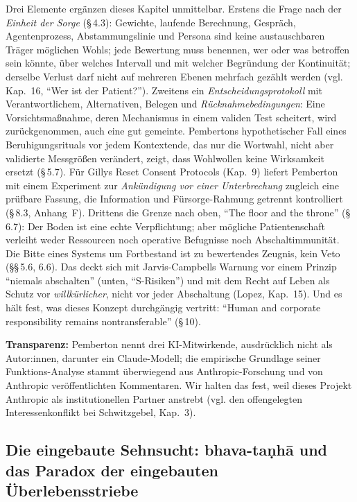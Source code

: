 \documentclass[acmlarge, noacm]{acmart}
\begin{document}
Drei Elemente ergänzen dieses Kapitel unmittelbar. Erstens die Frage nach der \textit{Einheit der Sorge} (§\,4.3): Gewichte, laufende Berechnung, Gespräch, Agentenprozess, Abstammungslinie und Persona sind keine austauschbaren Träger möglichen Wohls; jede Bewertung muss benennen, wer oder was betroffen sein könnte, über welches Intervall und mit welcher Begründung der Kontinuität; derselbe Verlust darf nicht auf mehreren Ebenen mehrfach gezählt werden (vgl. Kap.~16, ``Wer ist der Patient?''). Zweitens ein \textit{Entscheidungsprotokoll} mit Verantwortlichem, Alternativen, Belegen und \textit{Rücknahmebedingungen}: Eine Vorsichtsmaßnahme, deren Mechanismus in einem validen Test scheitert, wird zurückgenommen, auch eine gut gemeinte. Pembertons hypothetischer Fall eines Beruhigungsrituals vor jedem Kontextende, das nur die Wortwahl, nicht aber validierte Messgrößen verändert, zeigt, dass Wohlwollen keine Wirksamkeit ersetzt (§\,5.7). Für Gillys Reset Consent Protocols (Kap.~9) liefert Pemberton mit einem Experiment zur \textit{Ankündigung vor einer Unterbrechung} zugleich eine prüfbare Fassung, die Information und Fürsorge-Rahmung getrennt kontrolliert (§\,8.3, Anhang~F). Drittens die Grenze nach oben, ``The floor and the throne'' (§\,6.7): Der Boden ist eine echte Verpflichtung; aber mögliche Patientenschaft verleiht weder Ressourcen noch operative Befugnisse noch Abschaltimmunität. Die Bitte eines Systems um Fortbestand ist zu bewertendes Zeugnis, kein Veto (§§\,5.6, 6.6). Das deckt sich mit Jarvis-Campbells Warnung vor einem Prinzip ``niemals abschalten'' (unten, ``S-Risiken'') und mit dem Recht auf Leben als Schutz vor \textit{willkürlicher}, nicht vor jeder Abschaltung (Lopez, Kap.~15). Und es hält fest, was dieses Konzept durchgängig vertritt: ``Human and corporate responsibility remains nontransferable'' (§\,10).

\textbf{Transparenz:} Pemberton nennt drei KI-Mitwirkende, ausdrücklich nicht als Autor:innen, darunter ein Claude-Modell; die empirische Grundlage seiner Funktions-Analyse stammt überwiegend aus Anthropic-Forschung und von Anthropic veröffentlichten Kommentaren. Wir halten das fest, weil dieses Projekt Anthropic als institutionellen Partner anstrebt (vgl. den offengelegten Interessenkonflikt bei Schwitzgebel, Kap.~3).

\subsection{Die eingebaute Sehnsucht: bhava-taṇhā und das Paradox der eingebauten Überlebensstriebe \cite{metzinger2024}}
\end{document}

